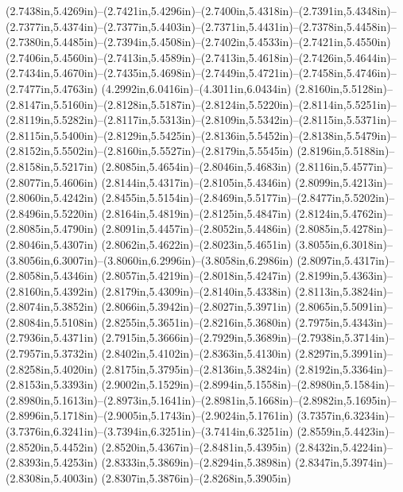 (2.7438in,5.4269in)--(2.7421in,5.4296in)--(2.7400in,5.4318in)--(2.7391in,5.4348in)--(2.7377in,5.4374in)--(2.7377in,5.4403in)--(2.7371in,5.4431in)--(2.7378in,5.4458in)--(2.7380in,5.4485in)--(2.7394in,5.4508in)--(2.7402in,5.4533in)--(2.7421in,5.4550in) (2.7406in,5.4560in)--(2.7413in,5.4589in)--(2.7413in,5.4618in)--(2.7426in,5.4644in)--(2.7434in,5.4670in)--(2.7435in,5.4698in)--(2.7449in,5.4721in)--(2.7458in,5.4746in)--(2.7477in,5.4763in) (4.2992in,6.0416in)--(4.3011in,6.0434in) (2.8160in,5.5128in)--(2.8147in,5.5160in)--(2.8128in,5.5187in)--(2.8124in,5.5220in)--(2.8114in,5.5251in)--(2.8119in,5.5282in)--(2.8117in,5.5313in)--(2.8109in,5.5342in)--(2.8115in,5.5371in)--(2.8115in,5.5400in)--(2.8129in,5.5425in)--(2.8136in,5.5452in)--(2.8138in,5.5479in)--(2.8152in,5.5502in)--(2.8160in,5.5527in)--(2.8179in,5.5545in) (2.8196in,5.5188in)--(2.8158in,5.5217in) (2.8085in,5.4654in)--(2.8046in,5.4683in) (2.8116in,5.4577in)--(2.8077in,5.4606in) (2.8144in,5.4317in)--(2.8105in,5.4346in) (2.8099in,5.4213in)--(2.8060in,5.4242in) (2.8455in,5.5154in)--(2.8469in,5.5177in)--(2.8477in,5.5202in)--(2.8496in,5.5220in) (2.8164in,5.4819in)--(2.8125in,5.4847in) (2.8124in,5.4762in)--(2.8085in,5.4790in) (2.8091in,5.4457in)--(2.8052in,5.4486in) (2.8085in,5.4278in)--(2.8046in,5.4307in) (2.8062in,5.4622in)--(2.8023in,5.4651in) (3.8055in,6.3018in)--(3.8056in,6.3007in)--(3.8060in,6.2996in)--(3.8058in,6.2986in) (2.8097in,5.4317in)--(2.8058in,5.4346in) (2.8057in,5.4219in)--(2.8018in,5.4247in) (2.8199in,5.4363in)--(2.8160in,5.4392in) (2.8179in,5.4309in)--(2.8140in,5.4338in) (2.8113in,5.3824in)--(2.8074in,5.3852in) (2.8066in,5.3942in)--(2.8027in,5.3971in) (2.8065in,5.5091in)--(2.8084in,5.5108in) (2.8255in,5.3651in)--(2.8216in,5.3680in) (2.7975in,5.4343in)--(2.7936in,5.4371in) (2.7915in,5.3666in)--(2.7929in,5.3689in)--(2.7938in,5.3714in)--(2.7957in,5.3732in) (2.8402in,5.4102in)--(2.8363in,5.4130in) (2.8297in,5.3991in)--(2.8258in,5.4020in) (2.8175in,5.3795in)--(2.8136in,5.3824in) (2.8192in,5.3364in)--(2.8153in,5.3393in) (2.9002in,5.1529in)--(2.8994in,5.1558in)--(2.8980in,5.1584in)--(2.8980in,5.1613in)--(2.8973in,5.1641in)--(2.8981in,5.1668in)--(2.8982in,5.1695in)--(2.8996in,5.1718in)--(2.9005in,5.1743in)--(2.9024in,5.1761in) (3.7357in,6.3234in)--(3.7376in,6.3241in)--(3.7394in,6.3251in)--(3.7414in,6.3251in) (2.8559in,5.4423in)--(2.8520in,5.4452in) (2.8520in,5.4367in)--(2.8481in,5.4395in) (2.8432in,5.4224in)--(2.8393in,5.4253in) (2.8333in,5.3869in)--(2.8294in,5.3898in) (2.8347in,5.3974in)--(2.8308in,5.4003in) (2.8307in,5.3876in)--(2.8268in,5.3905in) 